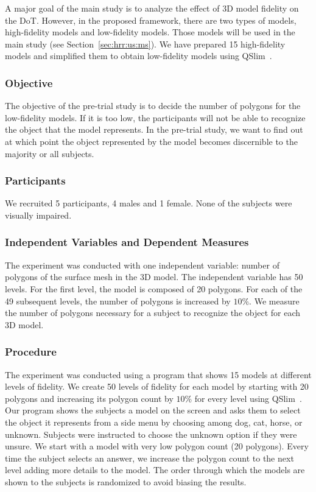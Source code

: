A major goal of the main study is to analyze the effect of 3D model fidelity on the DoT. However, in the proposed framework, there are two types of models, high-fidelity models and low-fidelity models. Those models will be used in the main study (see Section~\ref{sec:hrr:us:ms}). We have prepared 15 high-fidelity models and simplified them to obtain low-fidelity models using QSlim~\cite{garland1997}.

\subsubsection{Objective}

The objective of the pre-trial study is to decide the number of polygons for the low-fidelity models. If it is too low, the participants will not be able to recognize the object that the model represents. In the pre-trial study, we want to find out at which point the object represented by the model becomes discernible to the majority or all subjects.

\subsubsection{Participants}

We recruited 5 participants, 4 males and 1 female. None of the subjects were visually impaired.

\subsubsection{Independent Variables and Dependent Measures}
\label{sec:hrr:us:pts:ivdm}

The experiment was conducted with one independent variable: number of polygons of the surface mesh in the 3D model.
The independent variable has 50 levels. For the first level, the model is composed of 20 polygons. For each of the 49 subsequent levels, the number of polygons is increased by $10\%$. We measure the number of polygons necessary for a subject to recognize the object for each 3D model.

\subsubsection{Procedure}

The experiment was conducted using a program that shows 15 models at different levels of fidelity.  We create 50 levels of fidelity for each model by starting with 20 polygons and increasing its polygon count by $10\%$ for every level using QSlim~\cite{garland1997}. Our program shows the subjects a model on the screen and asks them to select the object it represents from a side menu by choosing among dog, cat, horse, or unknown. Subjects were instructed to choose the unknown option if they were unsure. We start with a model with very low polygon count (20 polygons). Every time the subject selects an answer, we increase the polygon count to the next level adding more details to the model. The order through which the models are shown to the subjects is randomized to avoid biasing the results. 

